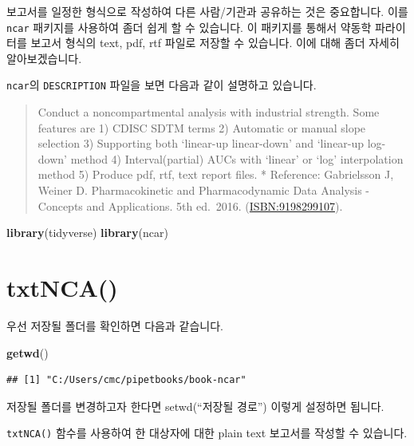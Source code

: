 \documentclass[
  12pt,
]{krantz}
\newenvironment{Shaded}{\begin{snugshade}}{\end{snugshade}}
\newcommand{\DataTypeTok}[1]{\textcolor[rgb]{0.13,0.29,0.53}{#1}}
\newcommand{\DecValTok}[1]{\textcolor[rgb]{0.00,0.00,0.81}{#1}}
\newcommand{\KeywordTok}[1]{\textcolor[rgb]{0.13,0.29,0.53}{\textbf{#1}}}
\newcommand{\NormalTok}[1]{#1}
\newcommand{\OperatorTok}[1]{\textcolor[rgb]{0.81,0.36,0.00}{\textbf{#1}}}
\newcommand{\StringTok}[1]{\textcolor[rgb]{0.31,0.60,0.02}{#1}}
\begin{document}
보고서를 일정한 형식으로 작성하여 다른 사람/기관과 공유하는 것은 중요합니다. 이를 \texttt{ncar} 패키지를 사용하여 좀더 쉽게 할 수 있습니다.
이 패키지를 통해서 약동학 파라이터를 보고서 형식의 text, pdf, rtf 파일로 저장할 수 있습니다.
이에 대해 좀더 자세히 알아보겠습니다.

\texttt{ncar}의 \texttt{DESCRIPTION} 파일을 보면 다음과 같이 설명하고 있습니다.

\begin{quote}
Conduct a noncompartmental analysis with industrial strength.
Some features are
1) CDISC SDTM terms
2) Automatic or manual slope selection
3) Supporting both `linear-up linear-down' and `linear-up log-down' method
4) Interval(partial) AUCs with `linear' or `log' interpolation method
5) Produce pdf, rtf, text report files.
* Reference: Gabrielsson J, Weiner D. Pharmacokinetic and Pharmacodynamic Data Analysis - Concepts and Applications. 5th ed.~2016. (\url{ISBN:9198299107}).
\end{quote}

\begin{Shaded}
\begin{Highlighting}[]
\KeywordTok{library}\NormalTok{(tidyverse)}
\KeywordTok{library}\NormalTok{(ncar)}
\end{Highlighting}
\end{Shaded}

\hypertarget{txtnca}{%
\section{txtNCA()}\label{txtnca}}

우선 저장될 폴더를 확인하면 다음과 같습니다.

\begin{Shaded}
\begin{Highlighting}[]
\KeywordTok{getwd}\NormalTok{()}
\end{Highlighting}
\end{Shaded}

\begin{verbatim}
## [1] "C:/Users/cmc/pipetbooks/book-ncar"
\end{verbatim}

저장될 폴더를 변경하고자 한다면 setwd(``저장될 경로'') 이렇게 설정하면 됩니다.

\texttt{txtNCA()} 함수를 사용하여 한 대상자에 대한 plain text 보고서를 작성할 수 있습니다.

\begin{Shaded}
\end{Shaded}
\end{document}
